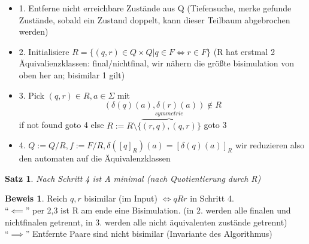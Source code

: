 \documentclass{article}
\newtheorem{satz}{Satz}
\theoremstyle{definition}
\newtheorem{beweis}{Beweis}[section]
\begin{document}
	\begin{itemize}
	 \item 1. Entferne nicht erreichbare Zustände aus Q (Tiefensuche, merke gefunde Zustände, sobald ein Zustand doppelt, kann dieser Teilbaum abgebrochen werden)
	 \item 2. Initialisiere $R=\{(q,r)\in Q\times Q| q\in F\iff r\in F\}$ (R hat erstmal 2 Äquivalienzklassen: final/nichtfinal, wir nähern die größte bisimulation von oben her an; bisimilar 1 gilt)\\
	 \item 3. Pick $(q,r)\in R, a\in \Sigma$ mit
	 \[(\delta(q)(a),\delta(r)(a))\notin R\]
	 if not found goto 4
	 else $R:= R\setminus \{\overbrace{(r,q),(q,r)}^{symmetrie}\}$ goto 3
	 \item 4. $Q:=Q/R, f:=F/R, \delta([q]_R)(a)=[\delta(q)(a)]_R$ wir reduzieren also den automaten auf die Äquivalenzklassen
	\end{itemize}
	\begin{satz} Nach Schritt 4 ist	A minimal (nach Quotientierung durch R)
	\end{satz}
	\begin{beweis} Reich $q,r$ bisimilar (im Input) $\iff qRr$ in Schritt 4.\\
	``$\impliedby$'' per 2,3 ist R am ende eine Bisimulation. (in 2. werden alle finalen und nichtfinalen getrennt, in 3. werden alle nicht äquivalenten zustände getrennt)\\
	``$\implies$'' Entfernte Paare sind nicht bisimilar (Invariante des Algorithmus)
	\end{beweis}
\end{document}
